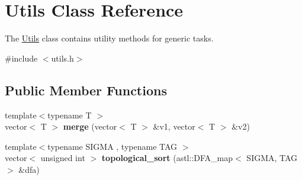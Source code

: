 \hypertarget{class_utils}{}\section{Utils Class Reference}
\label{class_utils}


The \hyperlink{class_utils}{Utils} class contains utility methods for generic tasks.  




{\ttfamily \#include $<$utils.\+h$>$}

\subsection*{Public Member Functions}
\begin{DoxyCompactItemize}
\item 
{\footnotesize template$<$typename T $>$ }\\vector$<$ T $>$ {\bfseries merge} (vector$<$ T $>$ \&v1, vector$<$ T $>$ \&v2)\hypertarget{class_utils_adc7e231723207c2f3354cddbe0a5a3d2}{}\label{class_utils_adc7e231723207c2f3354cddbe0a5a3d2}

\item 
{\footnotesize template$<$typename S\+I\+G\+MA , typename T\+AG $>$ }\\vector$<$ unsigned int $>$ {\bfseries topological\+\_\+sort} (astl\+::\+D\+F\+A\+\_\+map$<$ S\+I\+G\+MA, T\+AG $>$ \&dfa)\hypertarget{class_utils_ac45463d2407cd5fc9c435002ba53dcdd}{}\label{class_utils_ac45463d2407cd5fc9c435002ba53dcdd}

\end{DoxyCompactItemize}
